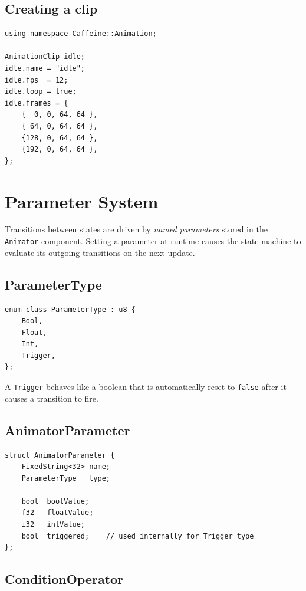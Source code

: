 \subsection{Creating a clip}

\begin{lstlisting}
using namespace Caffeine::Animation;

AnimationClip idle;
idle.name = "idle";
idle.fps  = 12;
idle.loop = true;
idle.frames = {
    {  0, 0, 64, 64 },
    { 64, 0, 64, 64 },
    {128, 0, 64, 64 },
    {192, 0, 64, 64 },
};
\end{lstlisting}

\section{Parameter System}

Transitions between states are driven by \emph{named parameters} stored in
the \texttt{Animator} component. Setting a parameter at runtime causes the
state machine to evaluate its outgoing transitions on the next update.

\subsection{ParameterType}

\begin{lstlisting}
enum class ParameterType : u8 {
    Bool,
    Float,
    Int,
    Trigger,
};
\end{lstlisting}

A \texttt{Trigger} behaves like a boolean that is automatically reset to
\texttt{false} after it causes a transition to fire.

\subsection{AnimatorParameter}

\begin{lstlisting}
struct AnimatorParameter {
    FixedString<32> name;
    ParameterType   type;

    bool  boolValue;
    f32   floatValue;
    i32   intValue;
    bool  triggered;    // used internally for Trigger type
};
\end{lstlisting}

\subsection{ConditionOperator}

